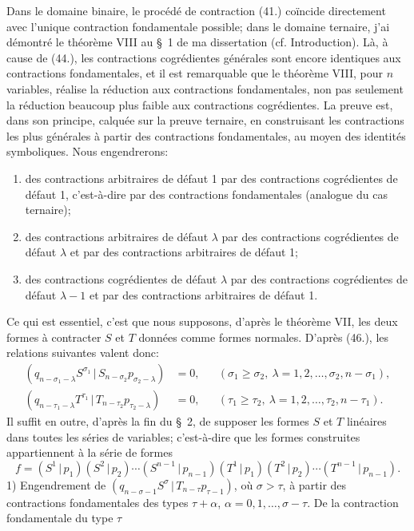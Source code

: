\documentclass[11pt]{article}
\newcommand{\pair}[2]{(#1\,|\,#2)}
\begin{document}
Dans le domaine binaire, le procédé de contraction (41.) coïncide directement avec l'unique contraction fondamentale possible; dans le domaine ternaire, j'ai démontré le théorème VIII au \S\ 1 de ma dissertation (cf. Introduction). Là, à cause de (44.), les contractions cogrédientes générales sont encore identiques aux contractions fondamentales, et il est remarquable que le théorème VIII, pour $n$ variables, réalise la réduction aux contractions fondamentales, non pas seulement la réduction beaucoup plus faible aux contractions cogrédientes. La preuve est, dans son principe, calquée sur la preuve ternaire, en construisant les contractions les plus générales à partir des contractions fondamentales, au moyen des identités symboliques. Nous engendrerons:
\begin{enumerate}
\item des contractions arbitraires de défaut 1 par des contractions cogrédientes de défaut 1, c'est-à-dire par des contractions fondamentales (analogue du cas ternaire);
\item des contractions arbitraires de défaut $\lambda$ par des contractions cogrédientes de défaut $\lambda$ et par des contractions arbitraires de défaut 1;
\item des contractions cogrédientes de défaut $\lambda$ par des contractions cogrédientes de défaut $\lambda-1$ et par des contractions arbitraires de défaut 1.
\end{enumerate}
Ce qui est essentiel, c'est que nous supposons, d'après le théorème VII, les deux formes à contracter $S$ et $T$ données comme formes normales. D'après (46.), les relations suivantes valent donc:
\begin{equation}
\begin{aligned}
\pair{q_{n-\sigma_1-\lambda}S^{\sigma_1}}{S_{n-\sigma_2}p_{\sigma_2-\lambda}}&=0,
&& (\sigma_1\ge\sigma_2,\ \lambda=1,2,\ldots,\sigma_2,n-\sigma_1),\\
\pair{q_{n-\tau_1-\lambda}T^{\tau_1}}{T_{n-\tau_2}p_{\tau_2-\lambda}}&=0,
&& (\tau_1\ge\tau_2,\ \lambda=1,2,\ldots,\tau_2,n-\tau_1).
\end{aligned}
\tag{62}
\end{equation}
Il suffit en outre, d'après la fin du \S\ 2, de supposer les formes $S$ et $T$ linéaires dans toutes les séries de variables; c'est-à-dire que les formes construites appartiennent à la série de formes
\[
 f=\pair{S^1}{p_1}\pair{S^2}{p_2}\cdots\pair{S^{n-1}}{p_{n-1}}
   \pair{T^1}{p_1}\pair{T^2}{p_2}\cdots\pair{T^{n-1}}{p_{n-1}}.
\]
1) Engendrement de $\pair{q_{n-\sigma-1}S^\sigma}{T_{n-\tau}p_{\tau-1}}$, où $\sigma>\tau$, à partir des contractions fondamentales des types $\tau+\alpha$, $\alpha=0,1,\ldots,\sigma-\tau$. De la contraction fondamentale du type $\tau$
\end{document}
